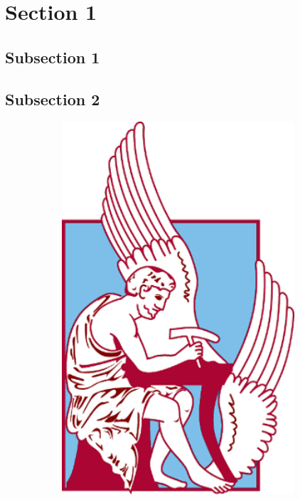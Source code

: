 \section{Section 1}

\subsection{Subsection 1}
\label{theory:1_phase}

\subsection*{Subsection 2}
\label{subsection2}

\begin{figure}[h]
	\centering
	\begin{subfigure}{.5\textwidth}
		\centering
		\includegraphics[width=0.95\textwidth]{Images/university.png}

\end{subfigure}
\end{figure}

